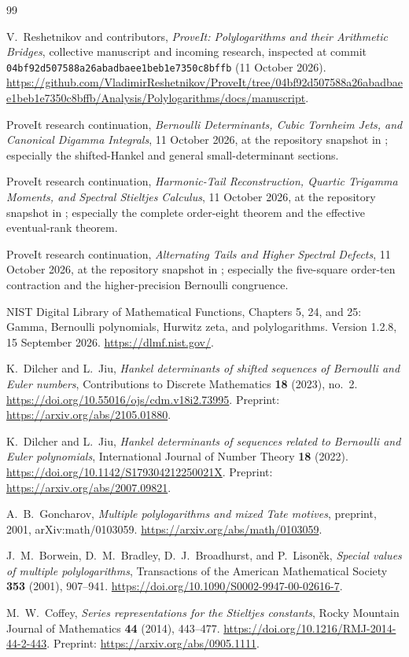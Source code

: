 \begin{thebibliography}{99}

V.~Reshetnikov and contributors,
\emph{ProveIt: Polylogarithms and their Arithmetic Bridges},
collective manuscript and incoming research, inspected at commit
\texttt{04bf92d507588a26abadbaee1beb1e7350c8bffb} (11 October 2026).
\url{https://github.com/VladimirReshetnikov/ProveIt/tree/04bf92d507588a26abadbaee1beb1e7350c8bffb/Analysis/Polylogarithms/docs/manuscript}.

ProveIt research continuation,
\emph{Bernoulli Determinants, Cubic Tornheim Jets, and Canonical Digamma Integrals},
11 October 2026, at the repository snapshot in \cite{Repo}; especially
the shifted-Hankel and general small-determinant sections.

ProveIt research continuation,
\emph{Harmonic-Tail Reconstruction, Quartic Trigamma Moments, and
Spectral Stieltjes Calculus}, 11 October 2026, at the repository snapshot
in \cite{Repo}; especially the complete order-eight theorem and the
effective eventual-rank theorem.

ProveIt research continuation,
\emph{Alternating Tails and Higher Spectral Defects}, 11 October 2026,
at the repository snapshot in \cite{Repo}; especially the five-square
order-ten contraction and the higher-precision Bernoulli congruence.

NIST Digital Library of Mathematical Functions,
Chapters 5, 24, and 25: Gamma, Bernoulli polynomials, Hurwitz zeta, and
polylogarithms.  Version 1.2.8, 15 September 2026.
\url{https://dlmf.nist.gov/}.

K.~Dilcher and L.~Jiu,
\emph{Hankel determinants of shifted sequences of Bernoulli and Euler numbers},
Contributions to Discrete Mathematics \textbf{18} (2023), no.~2.
\url{https://doi.org/10.55016/ojs/cdm.v18i2.73995}.
Preprint: \url{https://arxiv.org/abs/2105.01880}.

K.~Dilcher and L.~Jiu,
\emph{Hankel determinants of sequences related to Bernoulli and Euler polynomials},
International Journal of Number Theory \textbf{18} (2022).
\url{https://doi.org/10.1142/S179304212250021X}.
Preprint: \url{https://arxiv.org/abs/2007.09821}.

A.~B.~Goncharov,
\emph{Multiple polylogarithms and mixed Tate motives},
preprint, 2001, arXiv:math/0103059.
\url{https://arxiv.org/abs/math/0103059}.

J.~M.~Borwein, D.~M.~Bradley, D.~J.~Broadhurst, and P.~Lison\v{e}k,
\emph{Special values of multiple polylogarithms},
Transactions of the American Mathematical Society \textbf{353} (2001),
907--941.
\url{https://doi.org/10.1090/S0002-9947-00-02616-7}.

M.~W.~Coffey,
\emph{Series representations for the Stieltjes constants},
Rocky Mountain Journal of Mathematics \textbf{44} (2014), 443--477.
\url{https://doi.org/10.1216/RMJ-2014-44-2-443}.
Preprint: \url{https://arxiv.org/abs/0905.1111}.

\end{thebibliography}
